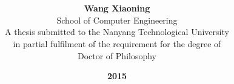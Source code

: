 \title{\vspace{0em}{\huge\bf Centroidal Voronoi Tessellation and Its Applications}\\[0em]}





\author{
{\rm\bf Wang Xiaoning}\\[14em]
{\large School of Computer Engineering}\\[3em]
{\small A thesis submitted to the Nanyang Technological University} \\
{\small in partial fulfilment of the requirement for the degree of}\\
{\small Doctor of Philosophy}\\
}

\date{\textbf{2015}}
\maketitle
\thispagestyle{empty}        %

%
%
